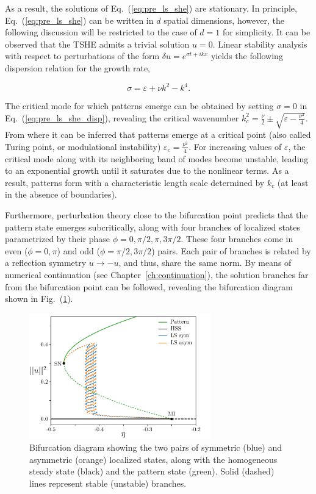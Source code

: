 As a result, the solutions of Eq.~(\ref{eq:pre_ls_she}) are stationary.
In principle, Eq.~(\ref{eq:pre_ls_she}) can be written in 
$d$ spatial dimensions, however, the following discussion will be restricted to the case of $d=1$ for simplicity.
It can be observed that the TSHE admits a trivial solution $u=0$. Linear
stability analysis with respect to perturbations of the form $\delta u = e^{\sigma t + ikx}$ yields
the following dispersion relation for the growth rate,

\begin{equation}
    \sigma = \varepsilon + \nu k^2 - k^4.
    \label{eq:pre_ls_she_disp}
\end{equation}

The critical mode for which patterns emerge can be obtained by setting $\sigma = 0$ in Eq.~(\ref{eq:pre_ls_she_disp}),
revealing the critical wavenumber $k_c^2 = \frac{\nu}{2} \pm \sqrt{\varepsilon - \frac{\nu^2}{4}}$. From where
it can be inferred that patterns emerge at a critical point (also called Turing point, or modulational instability) 
$\varepsilon_c = \frac{\nu^2}{4}$. For increasing values of $\varepsilon$,
the critical mode along with its neighboring band of modes become unstable, leading to an exponential growth
until it saturates due to the nonlinear terms. As a result, patterns form with a characteristic length scale determined
by $k_c$ (at least in the absence of boundaries).

Furthermore, perturbation theory close to the bifurcation point \cite{burke2007snakes}
predicts that the pattern state emerges subcritically, along with four branches of
localized states parametrized by their phase $\phi = 0, \pi/2, \pi, 3\pi/2$. These
four branches come in even ($\phi = 0, \pi$) and odd ($\phi = \pi/2, 3\pi/2$) pairs.
Each pair of branches is related by a reflection symmetry $u \to -u$, and thus,
share the same norm. By means of numerical continuation (see Chapter~\ref{ch:continuation}),
the solution branches far from the bifurcation point can be followed, revealing the
bifurcation diagram shown in Fig.~(\ref{fig:pre_ls_she_bif}).

\begin{figure}[h]
    \centering
    \includegraphics[width=0.7\textwidth]{imagenes/framework/LS/snaking_she35.pdf}
    \caption{Bifurcation diagram showing the two pairs of symmetric (blue) and asymmetric
    (orange) localized states, along with the homogeneous steady state (black) and the pattern state (green).
    Solid (dashed) lines represent stable (unstable) branches.}
    \label{fig:pre_ls_she_bif}
\end{figure}

